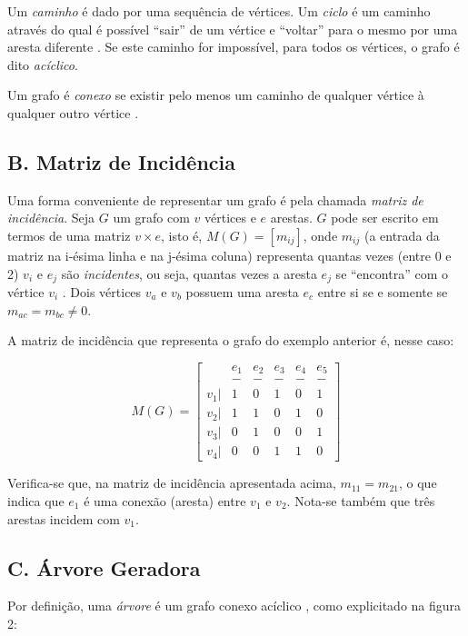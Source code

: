 \documentclass[twocolumn, 10pt,a4paper]{extarticle}
\begin{document}
Um \textit{caminho} é dado por uma sequência de vértices. Um \textit{ciclo} é um caminho através do qual é possível ``sair'' de um vértice e ``voltar'' para o mesmo por uma aresta diferente \cite[p. 519]{sedgewick}. Se este caminho for impossível, para todos os vértices, o grafo é dito \textit{acíclico}.

Um grafo é \textit{conexo} se existir pelo menos um caminho de qualquer vértice à qualquer outro vértice \cite[p. 519]{sedgewick}.

\subsection*{B. \quad Matriz de Incidência}

Uma forma conveniente de representar um grafo é pela chamada \textit{matriz de incidência}. Seja $G$ um grafo com $v$ vértices e $e$ arestas. $G$ pode ser escrito em termos de uma matriz $v \times e$, isto é, $M(G) = [m_{ij}]$, onde $m_{ij}$ (a entrada da matriz na i-ésima linha e na j-ésima coluna) representa quantas vezes (entre 0 e 2) $v_i$ e $e_j$ são \textit{incidentes}, ou seja, quantas vezes a aresta $e_j$ se ``encontra'' com o vértice $v_i$ \cite[p. 7]{bondy}. Dois vértices $v_a$ e $v_b$ possuem uma aresta $e_c$ entre si se e somente se $m_{ac} = m_{bc} \neq 0$.

A matriz de incidência que representa o grafo do exemplo anterior é, nesse caso:

\[
M(G) = 
\begin{bmatrix}
 & e_1 & e_2 & e_3 & e_4 & e_5 \\
 & - & - & - & - & - \\
 v_1 |& 1 & 0 & 1 & 0 & 1\\
 v_2 |& 1 & 1 & 0 & 1 & 0\\
 v_3 |& 0 & 1 & 0 & 0 & 1\\
 v_4 |& 0 & 0 & 1 & 1 & 0
\end{bmatrix}
\]

Verifica-se que, na matriz de incidência apresentada acima, $m_{11} = m_{21}$, o que indica que $e_1$ é uma conexão (aresta) entre $v_1$ e $v_2$. Nota-se também que três arestas incidem com $v_1$. 

\subsection*{C. \quad Árvore Geradora}

Por definição, uma \textit{árvore} é um grafo conexo acíclico \cite[p. 520]{sedgewick}, como explicitado na figura 2:
\end{document}
